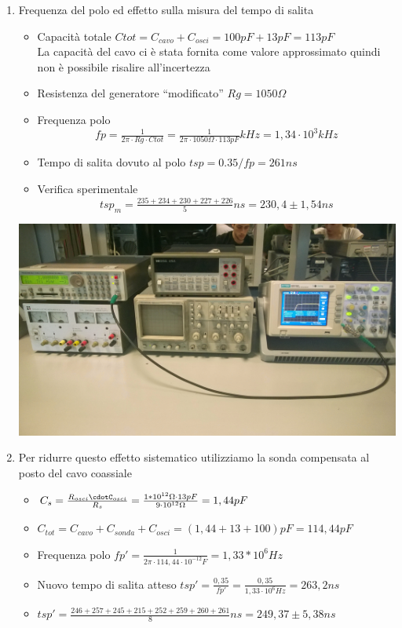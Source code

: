 \documentclass[a4paper]{article}
\begin{document}
\begin{enumerate}
\item Frequenza del polo ed effetto sulla misura del tempo di salita
  \begin{itemize}
    \item Capacità totale \(Ctot = C_{cavo} + C_{osci} = 100 pF + 13 pF = 113 pF\) \\ La capacità del cavo ci è stata fornita come valore approssimato quindi non è possibile risalire all'incertezza
    \item Resistenza del generatore ``modificato'' \(Rg= 1050 \Omega\)
    \item Frequenza polo \[fp = \tfrac{1}{2\pi \cdot Rg \cdot Ctot} = \tfrac{1}{2\pi \cdot 1050\Omega \cdot 113pF}kHz = 1,34\cdot10^3 kHz \]
    \item Tempo di salita dovuto al polo \(tsp= 0.35/fp = 261 ns\)
    \item Verifica sperimentale \[tsp_m = \tfrac{235+234+230+227+226}{5} ns = 230,4 \pm 1,54 ns\]
    \end{itemize}

\begin{center}
\includegraphics[scale=0.1]{foto/WP_20141009_010.jpg}
\end{center}

\item Per ridurre questo effetto sistematico utilizziamo la sonda compensata al posto del cavo coassiale
 \begin{itemize}
 \item  \(C_s=\tfrac{R_{osci}\cdotC_{osci}}{R_s}= \tfrac{1*10^{12}\Omega\cdot13 pF}{9\cdot10^{12}\Omega} = 1,44 pF\)
 \item \(C_{tot}= C_{cavo}+C_{sonda}+C_{osci} = (1,44 +13 +100)pF = 114,44 pF\)
 \item Frequenza polo \(fp' = \tfrac{1}{2\pi\cdot114,44\cdot10^{-12}F} = 1,33 * 10^6 Hz\)
 \item Nuovo tempo di salita atteso \(tsp'= \tfrac{0,35}{fp'} = \tfrac{0,35}{1,33\cdot10^6 Hz}= 263,2 ns\)
 \item \(tsp'= \tfrac{246+257+245+215+252+259+260+261}{8}ns = 249,37 \pm 5,38 ns\)
 \end{itemize}
\end{enumerate}
\end{document}
